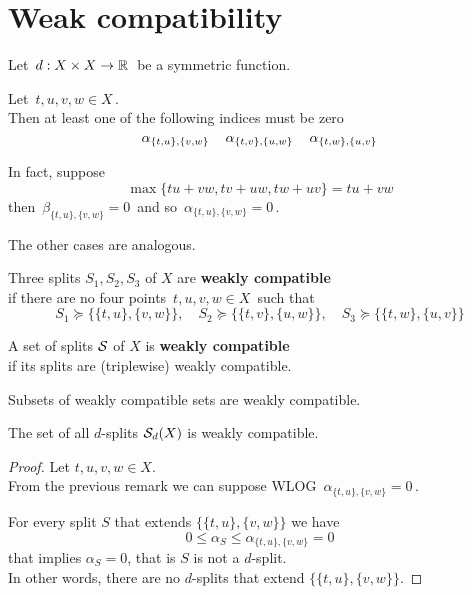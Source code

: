 \documentclass[./main.tex]{subfiles}
\begin{document}
\ifSubfilesClassLoaded{\mainmatter}{}

\chapter{Weak compatibility} \label{chap:p2c3}

Let $\, d : {X \times X} \to \mathbb{R} \,$ be a symmetric function.

\begin{remark}
    Let $\, t,u,v,w\in X \,$. \\
    Then at least one of the following indices must be zero
    \[ \alpha_{\{t,u\},\{v,w\}} \, \quad \alpha_{\{t,v\},\{u,w\}} \, \quad \alpha_{\{t,w\},\{u,v\}} \nospblw \bigskip \]

    In fact, suppose
    \[ \max {\{ tu + vw, tv + uw, tw + uv \}} = tu + vw \]
    then $\, \beta_{\{t,u\},\{v,w\}} = 0 \,$ and so $\, \alpha_{\{t,u\},\{v,w\}} = 0 \,$.

    The other cases are analogous.
\end{remark}

\begin{definition}
    Three splits $S_1,S_2,S_3$ of $X$ are \textbf{weakly compatible} \\
    \bsp if there are no four points $\, t,u,v,w \in X \,$ such that
    \[ S_1 \succcurlyeq \bigl\{ \{t,u\},\{v,w\} \bigr\}, \quad S_2 \succcurlyeq \bigl\{ \{t,v\},\{u,w\} \bigr\}, \quad S_3 \succcurlyeq \bigl\{ \{t,w\},\{u,v\} \bigr\} \]

    A set of splits ${\mathcal{S}}$ of $X$ is \textbf{weakly compatible} \\
    \bsp if its splits are (triplewise) weakly compatible.
\end{definition}

\begin{remark}
    Subsets of weakly compatible sets are weakly compatible.
\end{remark}

\begin{proposition} \label{prop:dswc}
    The set of all $d$-splits ${\mathcal{S}}_d(X)$ is weakly compatible.
\end{proposition}
\begin{proof}
    Let $t,u,v,w \in X$. \\
    From the previous remark we can suppose WLOG $\, \alpha_{\{t,u\},\{v,w\}} = 0 \,$.

    For every split $S$ that extends $\bigl\{ \{t,u\},\{v,w\} \bigr\}$ we have
    \[ 0 \leq \alpha_S \leq \alpha_{\{t,u\},\{v,w\}} = 0 \]
    that implies $\alpha_S = 0$, that is $S$ is not a $d$-split. \\
    In other words, there are no $d$-splits that extend $\bigl\{ \{t,u\},\{v,w\} \bigr\}$.
\end{proof}
\end{document}
